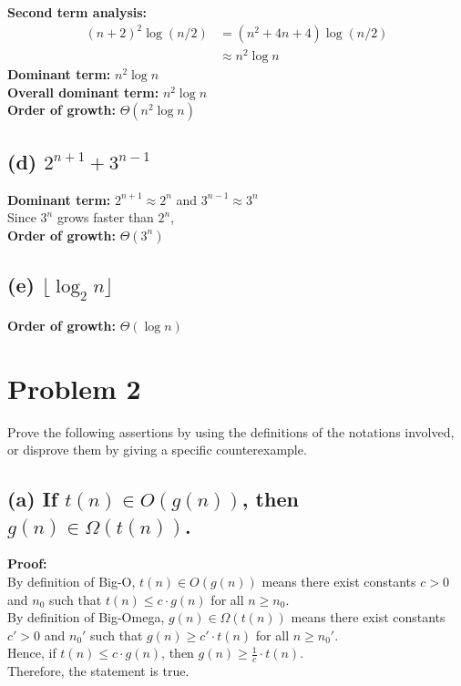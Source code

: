 \textbf{Second term analysis:} 
\begin{align*}
(n+2)^2 \log(n/2) &= (n^2 + 4n + 4) \log(n/2) \\
&\approx n^2 \log n
\end{align*}
\textbf{Dominant term:} \( n^2 \log n \) \\

\textbf{Overall dominant term:} \( n^2 \log n \) \\
\textbf{Order of growth:} \( \Theta(n^2 \log n) \)

\subsection*{(d) \(2^{n+1} + 3^{n-1}\)}
\textbf{Dominant term:} \(2^{n+1} \approx 2^n \) and \(3^{n-1} \approx 3^n \) \\
Since \( 3^n \) grows faster than \( 2^n \), \\
\textbf{Order of growth:} \( \Theta(3^n) \)

\subsection*{(e) \(\lfloor \log_2 n \rfloor\)}
\textbf{Order of growth:} \( \Theta(\log n) \)

\section*{Problem 2}
Prove the following assertions by using the definitions of the notations involved, or disprove them by giving a specific counterexample.

\subsection*{(a) If \(t(n) \in O(g(n))\), then \(g(n) \in \Omega(t(n))\).}
\textbf{Proof:} \\
By definition of Big-O, \( t(n) \in O(g(n)) \) means there exist constants \( c > 0 \) and \( n_0 \) such that \( t(n) \leq c \cdot g(n) \) for all \( n \geq n_0 \). \\
By definition of Big-Omega, \( g(n) \in \Omega(t(n)) \) means there exist constants \( c' > 0 \) and \( n_0' \) such that \( g(n) \geq c' \cdot t(n) \) for all \( n \geq n_0' \). \\
Hence, if \( t(n) \leq c \cdot g(n) \), then \( g(n) \geq \frac{1}{c} \cdot t(n) \). \\
Therefore, the statement is true.

